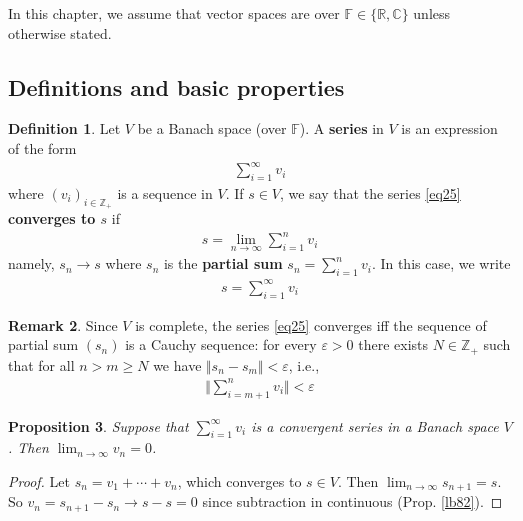 \documentclass[12pt,b5paper,notitlepage]{article}
\theoremstyle{definition}
\newtheorem{df}{Definition}[section]
\newtheorem{rem}[df]{Remark}
\theoremstyle{plain}
\newtheorem{pp}[df]{Proposition}
\newcommand{\Cbb}{\mathbb C}
\newcommand{\Zbb}{\mathbb Z}
\newcommand{\Rbb}{\mathbb R}
\newcommand{\Fbb}{\mathbb F}
\newcommand{\dps}{\displaystyle}
\newcommand{\eps}{\varepsilon}
\numberwithin{equation}{section}
\begin{document}
In this chapter, we assume that vector spaces are over $\Fbb\in\{\Rbb,\Cbb\}$ unless otherwise stated.





\subsection{Definitions and basic properties}


\begin{df}
Let $V$ be a Banach space (over $\Fbb$). A \textbf{series}  in $V$ is an expression of the form
\begin{align}
\sum_{i=1}^\infty v_i  \label{eq25}
\end{align}
where $(v_i)_{i\in\Zbb_+}$ is a sequence in $V$. If $s\in V$, we say that the series \eqref{eq25} \textbf{converges to $s$} if
\begin{align*}
s=\lim_{n\rightarrow\infty} \sum_{i=1}^n v_i
\end{align*}
namely, $s_n\rightarrow s$ where $s_n$ is the \textbf{partial sum}  $s_n=\sum_{i=1}^n v_i$. In this case, we write
\begin{align*}
s=\sum_{i=1}^\infty v_i
\end{align*}
\end{df}


\begin{rem}\label{lb93}
Since $V$ is complete, the series \eqref{eq25} converges iff the sequence of partial sum $(s_n)$ is a Cauchy sequence: for every $\eps>0$ there exists $N\in\Zbb_+$ such that for all $n> m\geq N$ we have $\Vert s_n-s_m\Vert<\eps$, i.e.,
\begin{align}
\Big\Vert \sum_{i=m+1}^n v_i\Big\Vert<\eps  \label{eq28}
\end{align}
\end{rem}


\begin{pp}\label{lb92}
Suppose that $\sum_{i=1}^\infty v_i$ is a convergent series in a Banach space $V$. Then $\dps\lim_{n\rightarrow\infty} v_n=0$.
\end{pp}

\begin{proof}
Let $s_n=v_1+\cdots+v_n$, which converges to $s\in V$. Then $\lim_{n\rightarrow\infty} s_{n+1}=s$. So $v_n=s_{n+1}-s_n\rightarrow s-s=0$ since subtraction in continuous (Prop. \ref{lb82}).
\end{proof}
\end{document}
